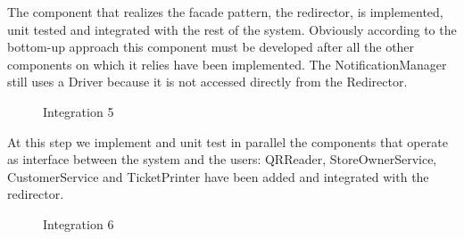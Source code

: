 The component that realizes the facade pattern, the redirector, is implemented, unit tested and integrated with the rest of the system. Obviously according to the bottom-up approach this component must be developed after all the other components on which it relies have been implemented. The NotificationManager still uses a Driver because it is not accessed directly from the Redirector. 
\begin{figure}[H]
	\noindent
	\caption{Integration 5} %
\end{figure}
At this step we implement and unit test in parallel the components that operate as interface between the system and the users: QRReader, StoreOwnerService, CustomerService and TicketPrinter have been added and integrated with the redirector.
\begin{figure}[H]
	\noindent
	\caption{Integration 6} %
\end{figure}
